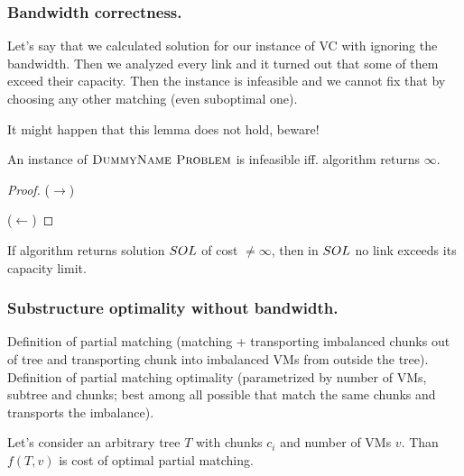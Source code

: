 \subsubsection{Bandwidth correctness.}

\begin{lemma}
Let's say that we calculated solution for our instance of VC with
ignoring the bandwidth. Then we analyzed every link and it turned out
that some of them exceed their capacity. Then the instance is
infeasible and we cannot fix that by choosing any other matching (even
suboptimal one).
\end{lemma}

It might happen that this lemma does not hold, beware!

\begin{lemma}
An instance of $\textsc{DummyName Problem}$ is infeasible iff. algorithm returns
$\infty$.
\end{lemma}
\begin{proof}
  ($\rightarrow$)

  ($\leftarrow$) \end{proof}

\begin{lemma}
  If algorithm returns solution $SOL$ of cost $\neq \infty$, then in
  $SOL$ no link exceeds its capacity limit.  \end{lemma}

\subsubsection{Substructure optimality without bandwidth.}

Definition of partial matching (matching + transporting imbalanced
chunks out of tree and transporting chunk into imbalanced VMs from
outside the tree). Definition of partial matching optimality
(parametrized by number of VMs, subtree and chunks; best among all
possible that match the same chunks and transports the imbalance).
\begin{lemma}

Let's consider an arbitrary tree $T$ with chunks $c_i$ and number of
VMs $v$. Than $f(T, v)$ is cost of optimal partial matching.

\end{lemma}

